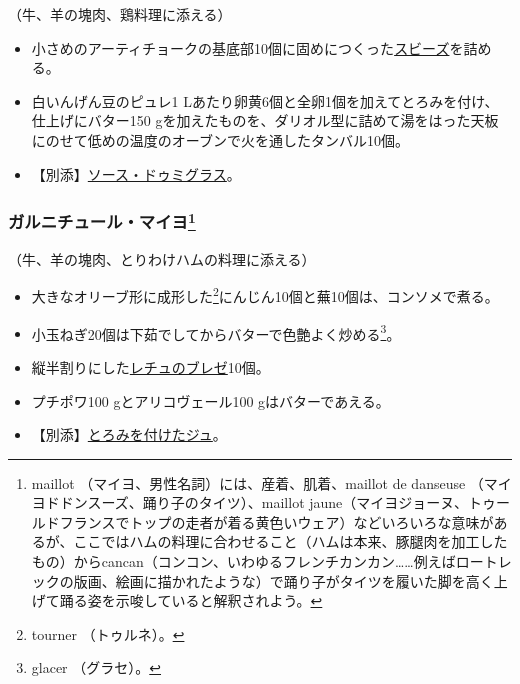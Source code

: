 \begin{recette}


（牛、羊の塊肉、鶏料理に添える）

\begin{itemize}
\item
  小さめのアーティチョークの基底部10個に固めにつくった\protect\hyperlink{sauce-soubise}{スビーズ}を詰める。
\item
  白いんげん豆のピュレ1
  Lあたり卵黄6個と全卵1個を加えてとろみを付け、仕上げにバター150
  gを加えたものを、ダリオル型に詰めて湯をはった天板にのせて低めの温度のオーブンで火を通したタンバル10個。
\item
  【別添】\protect\hyperlink{sauce-demi-glace}{ソース・ドゥミグラス}。
\end{itemize}

\atoaki{}

\hypertarget{garniture-maillot}{%
\subsubsection[ガルニチュール・マイヨ]{\texorpdfstring{ガルニチュール・マイヨ\footnote{maillot
  （マイヨ、男性名詞）には、産着、肌着、maillot de danseuse
  （マイヨドドンスーズ、踊り子のタイツ）、maillot
  jaune（マイヨジョーヌ、トゥールドフランスでトップの走者が着る黄色いウェア）などいろいろな意味があるが、ここではハムの料理に合わせること（ハムは本来、豚腿肉を加工したもの）からcancan（コンコン、いわゆるフレンチカンカン\ldots{}\ldots{}例えばロートレックの版画、絵画に描かれたような）で踊り子がタイツを履いた脚を高く上げて踊る姿を示唆していると解釈されよう。}}{ガルニチュール・マイヨ}}\label{garniture-maillot}}



（牛、羊の塊肉、とりわけハムの料理に添える）

\begin{itemize}
\item
  大きなオリーブ形に成形した\footnote{tourner （トゥルネ）。}にんじん10個と蕪10個は、コンソメで煮る。
\item
  小玉ねぎ20個は下茹でしてからバターで色艶よく炒める\footnote{glacer
    （グラセ）。}。
\item
  縦半割りにした\protect\hyperlink{laitues-braisees-au-jus}{レチュのブレゼ}10個。
\item
  プチポワ100 gとアリコヴェール100 gはバターであえる。
\item
  【別添】\protect\hyperlink{jus-de-veau-lie}{とろみを付けたジュ}。
\end{itemize}


\end{recette}
